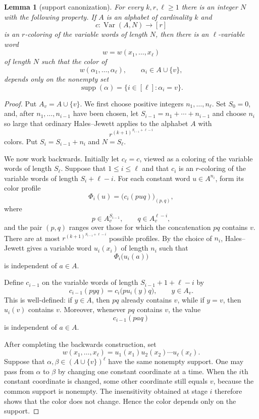 \documentclass[11pt]{article}
\newtheorem{lemma}[theorem]{Lemma}
\theoremstyle{remark}
\newcommand{\supp}{\operatorname{supp}}
\newcommand{\Var}{\operatorname{Var}}
\begin{document}
\begin{lemma}[support canonization]\label{lem:canonization}
For every $k,r,\ell\ge 1$ there is an integer $N$ with the following
property. If $A$ is an alphabet of cardinality $k$ and
\[
  c:\Var(A,N)\longrightarrow [r]
\]
is an $r$-coloring of the variable words of length $N$, then there is an
$\ell$-variable word
\[
  w=w(x_1,\dots,x_\ell)
\]
of length $N$ such that the color of
\[
  w(\alpha_1,\dots,\alpha_\ell),
  \qquad \alpha_i\in A\cup\{v\},
\]
depends only on the nonempty set
\[
  \supp(\alpha)=\{i\in[\ell]:\alpha_i=v\}.
\]
\end{lemma}

\begin{proof}
Put $A_v=A\cup\{v\}$. We first choose positive integers
$n_1,\dots,n_\ell$. Set $S_0=0$, and, after $n_1,\dots,n_{i-1}$ have been
chosen, let $S_{i-1}=n_1+\cdots+n_{i-1}$ and choose $n_i$ so large that
ordinary Hales--Jewett applies to the alphabet $A$ with
\[
  r^{(k+1)^{S_{i-1}+\ell-i}}
\]
colors. Put $S_i=S_{i-1}+n_i$ and $N=S_\ell$.

We now work backwards. Initially let $c_\ell=c$, viewed as a coloring of
the variable words of length $S_\ell$. Suppose that $1\le i\le\ell$ and
that $c_i$ is an $r$-coloring of the variable words of length
$S_i+\ell-i$. For each constant word $u\in A^{n_i}$, form its color profile
\[
  \Phi_i(u)
  =\bigl(c_i(puq)\bigr)_{(p,q)},
\]
where
\[
  p\in A_v^{S_{i-1}},\qquad q\in A_v^{\ell-i},
\]
and the pair $(p,q)$ ranges over those for which the concatenation $pq$
contains $v$. There are at most
$r^{(k+1)^{S_{i-1}+\ell-i}}$ possible profiles. By the choice of $n_i$,
Hales--Jewett gives a variable word $u_i(x_i)$ of length $n_i$ such that
\[
  \Phi_i\bigl(u_i(a)\bigr)
\]
is independent of $a\in A$.

Define $c_{i-1}$ on the variable words of length
$S_{i-1}+1+\ell-i$ by
\[
  c_{i-1}(pyq)=c_i\bigl(pu_i(y)q\bigr),
  \qquad y\in A_v.
\]
This is well-defined: if $y\in A$, then $pq$ already contains $v$, while
if $y=v$, then $u_i(v)$ contains $v$. Moreover, whenever $pq$ contains
$v$, the value
\[
  c_{i-1}(paq)
\]
is independent of $a\in A$.

After completing the backwards construction, set
\[
  w(x_1,\dots,x_\ell)
  =u_1(x_1)u_2(x_2)\cdots u_\ell(x_\ell).
\]
Suppose that $\alpha,\beta\in(A\cup\{v\})^\ell$ have the same nonempty
support. One may pass from $\alpha$ to $\beta$ by changing one constant
coordinate at a time. When the $i$th constant coordinate is changed, some
other coordinate still equals $v$, because the common support is nonempty.
The insensitivity obtained at stage $i$ therefore shows that the color does
not change. Hence the color depends only on the support.
\end{proof}
\end{document}
